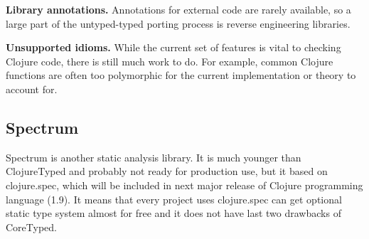 \textbf{Library annotations.} Annotations for external code are rarely
available, so a large part of the untyped-typed porting process is reverse
engineering libraries.

\textbf{Unsupported idioms.} While the current set of features is vital to
checking Clojure code, there is still much work to do. For example, common
Clojure functions are often too polymorphic for the current implementation or
theory to account for.



\subsection{Spectrum}
Spectrum is another static analysis library. It is much younger than
ClojureTyped and probably not ready for production use, but it based on
clojure.spec, which will be included in next major release of Clojure
programming language (1.9). It means that every project uses clojure.spec can
get optional static type system almost for free and it does not have last two
drawbacks of CoreTyped.






